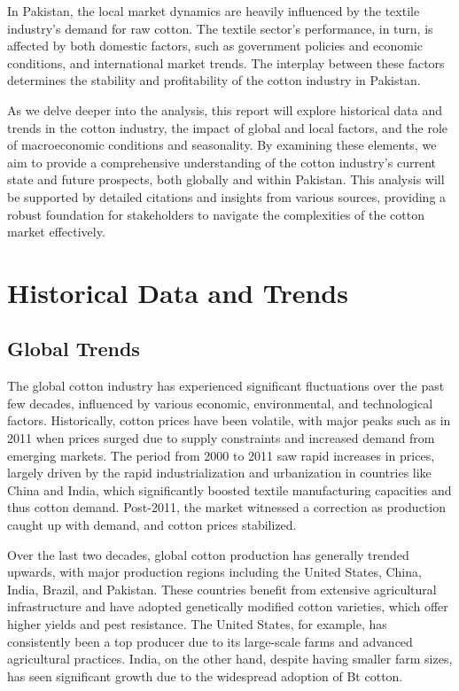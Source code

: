 \documentclass[12pt]{article}
\begin{document}
In Pakistan, the local market dynamics are heavily influenced by the textile industry's demand for raw cotton. The textile sector's performance, in turn, is affected by both domestic factors, such as government policies and economic conditions, and international market trends. The interplay between these factors determines the stability and profitability of the cotton industry in Pakistan.

As we delve deeper into the analysis, this report will explore historical data and trends in the cotton industry, the impact of global and local factors, and the role of macroeconomic conditions and seasonality. By examining these elements, we aim to provide a comprehensive understanding of the cotton industry's current state and future prospects, both globally and within Pakistan. This analysis will be supported by detailed citations and insights from various sources, providing a robust foundation for stakeholders to navigate the complexities of the cotton market effectively.

\section{Historical Data and Trends}
\subsection{Global Trends}
The global cotton industry has experienced significant fluctuations over the past few decades, influenced by various economic, environmental, and technological factors. Historically, cotton prices have been volatile, with major peaks such as in 2011 when prices surged due to supply constraints and increased demand from emerging markets. The period from 2000 to 2011 saw rapid increases in prices, largely driven by the rapid industrialization and urbanization in countries like China and India, which significantly boosted textile manufacturing capacities and thus cotton demand. Post-2011, the market witnessed a correction as production caught up with demand, and cotton prices stabilized.

Over the last two decades, global cotton production has generally trended upwards, with major production regions including the United States, China, India, Brazil, and Pakistan. These countries benefit from extensive agricultural infrastructure and have adopted genetically modified cotton varieties, which offer higher yields and pest resistance. The United States, for example, has consistently been a top producer due to its large-scale farms and advanced agricultural practices. India, on the other hand, despite having smaller farm sizes, has seen significant growth due to the widespread adoption of Bt cotton.
\end{document}
